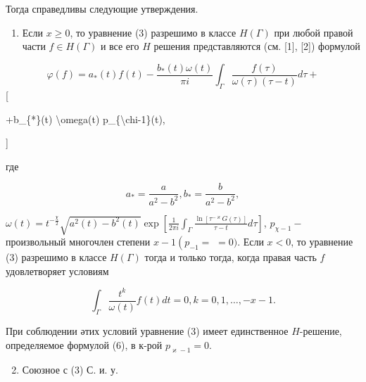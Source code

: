 \documentclass[10pt]{article}
\begin{document}
Тогда справедливы следующие утверждения.



\begin{enumerate}

  \item Если $x \geqslant 0$, то уравнение (3) разрешимо в классе $H(\Gamma)$ при любой правой части $f \in H(\Gamma)$ и все его $H$ решения представляются (см. [1], [2]) формулой

\end{enumerate}



\[

\varphi(f)=a_{*}(t) f(t)-\frac{b_{*}(t) \omega(t)}{\pi i} \int_{\Gamma} \frac{f(\tau)}{\omega(\tau)(\tau-t)} d \tau+

\][



+b\_\{*\}(t) \textbackslash omega(t) p\_\{\textbackslash chi-1\}(t),

]



где



\[

a_{*}=\frac{a}{a^{2}-b^{2}}, b_{*}=\frac{b}{a^{2}-b^{2}},

\]



$\omega(t)=t^{-\frac{\chi}{2}} \sqrt{a^{2}(t)-b^{2}(t)} \exp \left[\frac{1}{2 \pi i} \int_{\Gamma} \frac{\ln \left[\tau^{-\varkappa} G(\tau)\right]}{\tau-t} d \tau\right]$, $p_{\chi-1}-$ произвольный многочлен степени $x-1\left(p_{-1}=\right.$ $=0)$. Если $x<0$, то уравнение (3) разрешимо в классе $H(\Gamma)$ тогда и только тогда, когда правая часть $f$ удовлетворяет условиям



\[

\int_{\Gamma} \frac{t^{k}}{\omega(t)} f(t) d t=0, k=0,1, \ldots,-x-1 .

\]



При соблюдении әтих условий уравнение (3) имеет единственное $H$-решение, определяемое формулой (6), в к-рой $p_{\varkappa-1}=0$.



\begin{enumerate}

  \setcounter{enumi}{1}

  \item Союзное с (3) С. и. у.

\end{enumerate}
\end{document}

